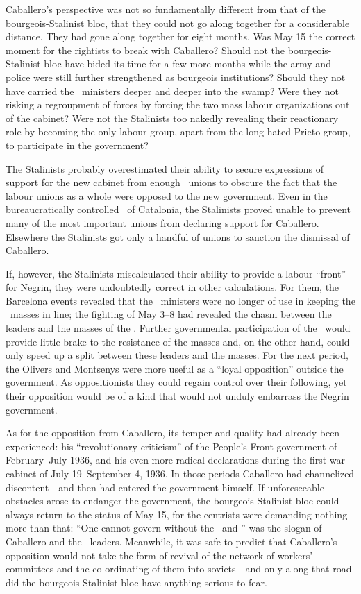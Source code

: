 Caballero’s perspective was not so fundamentally different from that of the bourgeois-Stalinist bloc, that they could not go along together for a considerable distance. They had gone along together for eight months. Was May 15 the correct moment for the rightists to break with Caballero? Should not the bourgeois-Stalinist bloc have bided its time for a few more months while the army and police were still further strengthened as bourgeois institutions? Should they not have carried the \CNT\ ministers deeper and deeper into the swamp? Were they not risking a regroupment of forces by forcing the two mass labour organizations out of the cabinet? Were not the Stalinists too nakedly revealing their reactionary role by becoming the only labour group, apart from the long-hated Prieto group, to participate in the government?

The Stalinists probably overestimated their ability to secure expressions of support for the new cabinet from enough \UGT\ unions to obscure the fact that the labour unions as a whole were opposed to the new government. Even in the bureaucratically controlled \UGT\ of Catalonia, the Stalinists proved unable to prevent many of the most important unions from declaring support for Caballero. Elsewhere the Stalinists got only a handful of unions to sanction the dismissal of Caballero.

If, however, the Stalinists miscalculated their ability to provide a labour ``front'' for Negrin, they were undoubtedly correct in other calculations. For them, the Barcelona events revealed that the \CNT\ ministers were no longer of use in keeping the \CNT\ masses in line; the fighting of May 3--8 had revealed the chasm between the leaders and the masses of the \CNT. Further governmental participation of the \CNT\ would provide little brake to the resistance of the masses and, on the other hand, could only speed up a split between these leaders and the masses. For the next period, the Olivers and Montsenys were more useful as a ``loyal opposition'' outside the government. As oppositionists they could regain control over their following, yet their opposition would be of a kind that would not unduly embarrass the Negrin government.

As for the opposition from Caballero, its temper and quality had already been experienced: his ``revolutionary criticism'' of the People’s Front government of February–July 1936, and his even more radical declarations during the first war cabinet of July 19--September 4, 1936. In those periods Caballero had channelized discontent---and then had entered the government himself. If unforeseeable obstacles arose to endanger the government, the bourgeois-Stalinist bloc could always return to the status of May 15, for the centrists were demanding nothing more than that: ``One cannot govern without the \UGT\ and \CNT'' was the slogan of Caballero and the \CNT\ leaders. Meanwhile, it was safe to predict that Caballero’s opposition would not take the form of revival of the network of workers’ committees and the co-ordinating of them into soviets---and only along that road did the bourgeois-Stalinist bloc have anything serious to fear.

